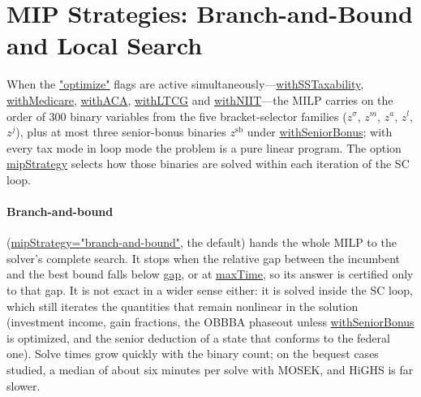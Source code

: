 \documentclass[fleqn,12pt]{report}
\newcommand{\code}[1]{\url{#1}}
\begin{document}
\section{MIP Strategies: Branch-and-Bound and Local Search}
\label{Sec:MIPDecomp}
\label{sec:decomposition}

When the \code{"optimize"} flags are active simultaneously---\code{withSSTaxability},
\code{withMedicare}, \code{withACA}, \code{withLTCG} and \code{withNIIT}---the MILP
carries on the order of 300 binary variables from the five bracket-selector families
($z^\sigma$, $z^m$, $z^a$, $z^l$, $z^j$), plus at most three senior-bonus binaries
$z^{\mathrm{sb}}$ under \code{withSeniorBonus}; with every tax mode in loop mode the
problem is a pure linear program. The option \code{mipStrategy} selects how those binaries are
solved within each iteration of the SC loop.

\paragraph*{Branch-and-bound} (\code{mipStrategy="branch-and-bound"}, the default) hands
the whole MILP to the solver's complete search. It stops when the relative gap between the
incumbent and the best bound falls below \code{gap}, or at \code{maxTime}, so its answer is
certified only to that gap. It is not exact in a wider sense either: it is solved inside the
SC loop, which still iterates the quantities that remain nonlinear in the solution
(investment income, gain fractions, the OBBBA phaseout unless \code{withSeniorBonus}
is optimized, and the senior deduction of a state that conforms to the federal one). Solve times grow quickly with the
binary count; on the bequest cases studied, a median of about six minutes per solve with
MOSEK, and HiGHS is far slower.
\end{document}

